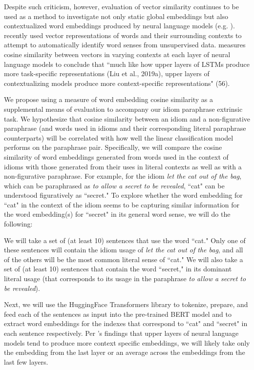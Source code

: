 \documentclass[11pt,a4paper]{article}
\begin{document}
Despite such criticism, however, evaluation of vector similarity continues to be used as a method to investigate not only static global embeddings but also contextualized word embeddings produced by neural language models (e.g. \citet{van_Aken_2019}). \citet{huang_cho_bowman_2020} recently used vector representations of words and their surrounding contexts to attempt to automatically identify word senses from unsupervised data. \citet{ethayarajh2019contextual} measures cosine similarity between vectors in varying contexts at each layer of neural language models to conclude that  ``much like how upper layers of LSTMs produce more task-specific
representations (Liu et al., 2019a), upper layers of contextualizing models produce more context-specific representations" (56).

We propose using a measure of word embedding cosine similarity as a supplemental means of evaluation to accompany our idiom paraphrase extrinsic task. We hypothesize that cosine similarity between an idiom and a non-figurative paraphrase (and words used in idioms and their corresponding literal paraphrase counterparts) will be correlated with how well the linear classification model performs on the paraphrase pair.
Specifically, we will compare the cosine similarity of word embeddings generated from words used in the context of idioms with those generated from their uses in literal contexts as well as with a non-figurative paraphrase. For example, for the idiom \textit{let the cat out of the bag}, which can be paraphrased as \textit{to allow a secret to be revealed}, ``cat" can be understood figuratively as ``secret." To explore whether the word embedding for ``cat" in the context of the idiom seems to be capturing similar information for the word embedding(s) for ``secret" in its general word sense, we will do the following:

 We will take a set of (at least 10) sentences that use the word ``cat."  Only one of these sentences will contain the idiom usage of \textit{let the cat out of the bag}, and all of the others will be the most common literal sense of ``cat." We will also take a set of (at least 10) sentences that contain the word ``secret," in its dominant literal usage (that corresponds to its usage in the paraphrase \textit{to allow a secret to be revealed}).
 
 Next, we will use the HuggingFace Transformers library \citep{wolf2019huggingfaces} to tokenize, prepare, and feed each of the sentences as input into the pre-trained BERT model and to extract word embeddings for the indexes that correspond to ``cat" and ``secret" in each sentence respectively. Per \citet{ethayarajh2019contextual}'s findings that upper layers of neural language models tend to produce more context specific embeddings, we will likely take only the embedding from the last layer or an average across the embeddings from the last few layers.
 
\end{document}
